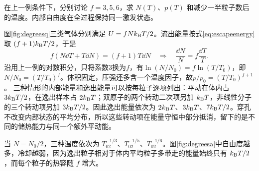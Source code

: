 \begin{example}\label{ex:degrees}
在上一例条件下，分别讨论 $f=3,5,6$，求 $N(T)$、$p(T)$ 和减少一半粒子数后的温度。内部自由度在全过程保持同一激发状态。
\end{example}
\begin{solution}
图\ref{fig:degreesq}三类气体分别满足 $U=fNk_{\mathrm B} T/2$。流出能量按式\eqref{eq:escapeenergy}取 $(f+1)k_{\mathrm B} T/2$，于是
\[
 f(N\dd T+T\dd N)=(f+1)T\dd N
 \quad\Rightarrow\quad \frac{\dd N}{N}=f\frac{\dd T}{T}.
\]
沿用上一例的对数积分，只将系数$3$换为$f$，有$\ln(N/N_0)=f\ln(T/T_0)$，即$N/N_0=(T/T_0)^f$。体积固定，压强还多含一个温度因子，故$p/p_0=(T/T_0)^{f+1}$。
三种情形的内部能量和逸出能量可以按每粒子逐项列出：平动在体内占 $3k_{\mathrm B} T/2$，在逸出样本占 $2k_{\mathrm B} T$；双原子的两个转动二次项另加 $k_{\mathrm B} T$，非线性分子的三个转动项另加 $3k_{\mathrm B} T/2$。因此逸出能量依次为 $2k_{\mathrm B} T$、$3k_{\mathrm B} T$、$7k_{\mathrm B} T/2$。穿孔不改变内部状态的平均分布，所以这些转动项在能量守恒中部分抵消，留下的是不同的储热能力与同一个额外平动能。

当 $N=N_0/2$，三种温度依次为 $T_02^{-1/3}$、$T_02^{-1/5}$、$T_02^{-1/6}$。图\ref{fig:degreesa}中自由度越多，冷却越弱，因为逸出粒子相对于体内平均粒子多带走的能量始终只有 $k_{\mathrm B} T/2$，而每个粒子的热容随 $f$ 增大。
\end{solution}

